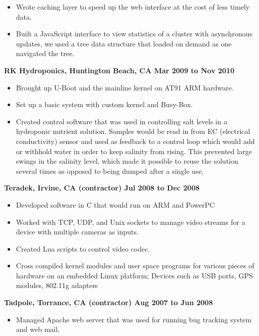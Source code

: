 \documentclass{res}
\begin{document}
\begin{resume}
\begin{itemize}
\item Wrote caching layer to speed up the web interface at the cost of
less timely data.

\item Built a JavaScript interface to view statistics of a cluster with
asynchronous updates, we used a tree data structure that loaded on demand
as one navigated the tree.

\end{itemize}

{\large \bf RK Hydroponics, Huntington Beach, CA \hfill Mar 2009 to Nov
2010} \begin{itemize}

\item Brought up U-Boot and the mainline kernel on AT91 ARM hardware.

\item Set up a basic system with custom kernel and Busy-Box.

\item Created control software that was used in controlling salt levels
in a hydroponic nutrient solution.  Samples would be read in from EC
(electrical conductivity) sensor and used as feedback to a control loop
which would add or withhold water in order to keep salinity from rising.
This prevented large swings in the salinity level, which made it possible
to reuse the solution several times as opposed to being dumped after a
single use.

\end{itemize}

{\large \bf Teradek, Irvine, CA (contractor) \hfill Jul 2008 to Dec 2008}
\begin{itemize}
\item Developed software in C that would run on ARM and PowerPC
\item Worked with TCP, UDP, and Unix sockets to manage video streams for
a device with multiple cameras as inputs.
\item Created Lua scripts to control video codec.
\item Cross compiled kernel modules and user space programs for various
pieces of hardware on an embedded Linux platform; Devices such as USB
ports, GPS modules, 802.11g adapters
\end{itemize}

{\large \bf Tadpole, Torrance, CA (contractor) \hfill Aug 2007 to Jun 2008}
\begin{itemize}

\item Managed Apache web server that was used for running bug
tracking system and web mail.


\end{itemize}
\end{resume}
\end{document}
